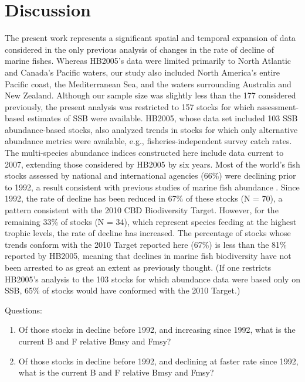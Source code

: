 \documentclass[letterpaper,12pt]{article}
\begin{document}
\section{Discussion} The present work represents a significant spatial
and temporal expansion of data considered in the only previous
analysis of changes in the rate of decline of marine fishes. Whereas
HB2005's data were limited primarily to North Atlantic and Canada's
Pacific waters, our study also included North America's entire Pacific
coast, the Mediterranean Sea, and the waters surrounding Australia and
New Zealand. Although our sample size was slightly less than the 177
considered previously, the present analysis was restricted to 157
stocks for which assessment-based estimates of SSB were
available. HB2005, whose data set included 103 SSB abundance-based
stocks, also analyzed trends in stocks for which only alternative
abundance metrics were available, e.g., fisheries-independent survey
catch rates. The multi-species abundance indices constructed here
include data current to 2007, extending those considered by HB2005 by
six years.  Most of the world's fish stocks assessed by national and
international agencies (66\%) were declining prior to 1992, a result
consistent with previous studies of marine fish abundance
\citep{Hutchings:2000:nature, Myers:Worm:2005:philtransB}. Since 1992,
the rate of decline has been reduced in 67\% of these stocks (N = 70),
a pattern consistent with the 2010 CBD Biodiversity Target. However,
for the remaining 33\% of stocks (N = 34), which represent species
feeding at the highest trophic levels, the rate of decline has
increased. The percentage of stocks whose trends conform with the 2010
Target reported here (67\%) is less than the 81\% reported by HB2005,
meaning that declines in marine fish biodiversity have not been
arrested to as great an extent as previously thought. (If one
restricts HB2005's analysis to the 103 stocks for which abundance data
were based only on SSB, 65\% of stocks would have conformed with the
2010 Target.)

Questions:
\begin{enumerate}
\item{Of those stocks in decline before 1992, and increasing since
1992, what is the current B and F relative Bmsy and Fmsy?}
\item{Of those stocks in decline before 1992, and declining at faster
rate since 1992, what is the current B and F relative Bmsy and Fmsy?}
\end{enumerate}
\end{document}
